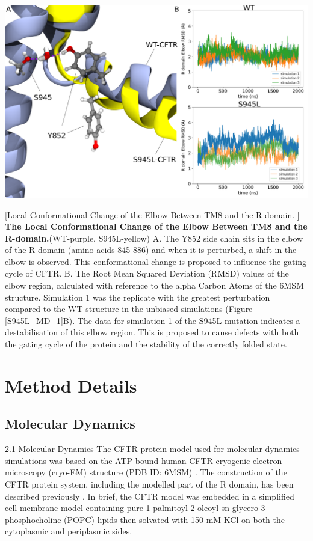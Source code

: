 \begin{center}
	\includegraphics[width=\textwidth]{figures/S945L/supp3_MD.pdf}
\end{center}
\begingroup
\captionsetup{singlelinecheck = false, justification=raggedright}
[Local Conformational Change of the Elbow Between TM8 and the R-domain. ] {\textbf{The Local Conformational Change of the Elbow Between TM8 and the R-domain.}}{(WT-purple, S945L-yellow) A. The Y852 side chain sits in the elbow of the R-domain (amino acids 845-886) and when it is perturbed, a shift in the elbow is observed. This conformational change is proposed to influence the gating cycle of CFTR. B. The Root Mean Squared Deviation (RMSD) values of the elbow region, calculated with reference to the alpha Carbon Atoms of the 6MSM structure. Simulation 1 was the replicate with the greatest perturbation compared to the WT structure in the unbiased simulations (Figure \ref{S945L_MD_1}B). The data for simulation 1 of the S945L mutation indicates a destabilisation of this elbow region. This is proposed to cause defects with both the gating cycle of the protein and the stability of the correctly folded state.}

\label{S945L_MD_S3}
\endgroup


\section{Method Details}
\subsection{Molecular Dynamics}
2.1 Molecular Dynamics
The CFTR protein model used for molecular dynamics simulations was based on the ATP-bound human CFTR cryogenic electron microscopy (cryo-EM) structure (PDB ID: 6MSM) \cite{zhang2018}. The construction of the CFTR protein system, including the modelled part of the R domain, has been described previously \cite{wong2022}. In brief, the CFTR model was embedded in a simplified cell membrane model containing pure 1-palmitoyl-2-oleoyl-sn-glycero-3-phosphocholine (POPC) lipids then solvated with 150 mM KCl on both the cytoplasmic and periplasmic sides.

